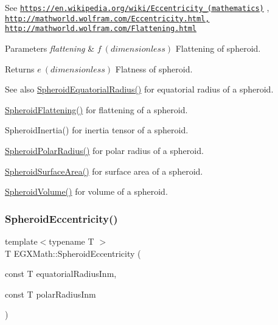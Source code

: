 See \href{https://en.wikipedia.org/wiki/Eccentricity_(mathematics)}{\tt https\+://en.\+wikipedia.\+org/wiki/\+Eccentricity\+\_\+(mathematics)} , \href{http://mathworld.wolfram.com/Eccentricity.html,}{\tt http\+://mathworld.\+wolfram.\+com/\+Eccentricity.\+html,} \href{http://mathworld.wolfram.com/Flattening.html}{\tt http\+://mathworld.\+wolfram.\+com/\+Flattening.\+html} 
\begin{DoxyParams}{Parameters}
{\em flattening} & $ f\ (dimensionless)$ Flattening of spheroid. \\
\hline
\end{DoxyParams}
\begin{DoxyReturn}{Returns}
$ e\ (dimensionless)$ Flatness of spheroid. 
\end{DoxyReturn}
\begin{DoxySeeAlso}{See also}
\mbox{\hyperlink{group___e_g_x_math-_geometry-3_d-_spheroid-_equatorial_radius_ga1cbe564fee1b509c622d1c6d276158cd}{Spheroid\+Equatorial\+Radius()}} for equatorial radius of a spheroid. 

\mbox{\hyperlink{group___e_g_x_math-_geometry-3_d-_spheroid-_flattening_ga05e3be91f5f7fbaa9371687aa3834179}{Spheroid\+Flattening()}} for flattening of a spheroid. 

Spheroid\+Inertia() for inertia tensor of a spheroid. 

\mbox{\hyperlink{group___e_g_x_math-_geometry-3_d-_spheroid-_polar_radius_gad4791a46a7efe39c63c03d2366fdd3d2}{Spheroid\+Polar\+Radius()}} for polar radius of a spheroid. 

\mbox{\hyperlink{group___e_g_x_math-_geometry-3_d-_spheroid-_surface_area_ga5a3580e7ded82cb678a558905f41ae49}{Spheroid\+Surface\+Area()}} for surface area of a spheroid. 

\mbox{\hyperlink{group___e_g_x_math-_geometry-3_d-_spheroid-_volume_ga12125484235e94b8f2580f3476b05b92}{Spheroid\+Volume()}} for volume of a spheroid. 
\end{DoxySeeAlso}
\mbox{\label{group___e_g_x_math-_geometry-3_d-_spheroid-_eccentricity_ga0b6ce84e9c4c2fd5bc5a29569c2c2295}} 
\subsubsection{\texorpdfstring{Spheroid\+Eccentricity()}{SpheroidEccentricity()}\hspace{0.1cm}{\footnotesize\ttfamily [2/2]}}
{\footnotesize\ttfamily template$<$typename T $>$ \\
T E\+G\+X\+Math\+::\+Spheroid\+Eccentricity (\begin{DoxyParamCaption}\item[{const T}]{equatorial\+Radius\+Inm,  }\item[{const T}]{polar\+Radius\+Inm }\end{DoxyParamCaption})}



